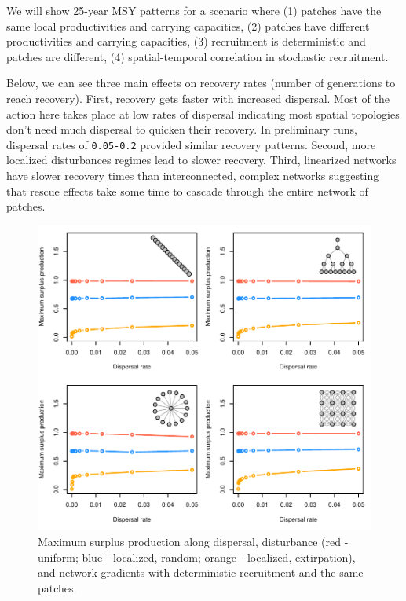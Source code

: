 \documentclass[]{article}
\begin{document}
We will show 25-year MSY patterns for a scenario where (1) patches have
the same local productivities and carrying capacities, (2) patches have
different productivities and carrying capacities, (3) recruitment is
deterministic and patches are different, (4) spatial-temporal
correlation in stochastic recruitment.

Below, we can see three main effects on recovery rates (number of
generations to reach recovery). First, recovery gets faster with
increased dispersal. Most of the action here takes place at low rates of
dispersal indicating most spatial topologies don't need much dispersal
to quicken their recovery. In preliminary runs, dispersal rates of
\texttt{0.05-0.2} provided similar recovery patterns. Second, more
localized disturbances regimes lead to slower recovery. Third,
linearized networks have slower recovery times than interconnected,
complex networks suggesting that rescue effects take some time to
cascade through the entire network of patches.

\begin{figure}[H]

{\centering \includegraphics{Managing_for_ecological_surprises_in_metapopulations_files/figure-latex/MSY-1} 

}

\caption{Maximum surplus production along dispersal, disturbance (red - uniform; blue - localized, random; orange - localized, extirpation), and network gradients with deterministic recruitment and the same patches.}\label{fig:MSY}
\end{figure}
\end{document}
